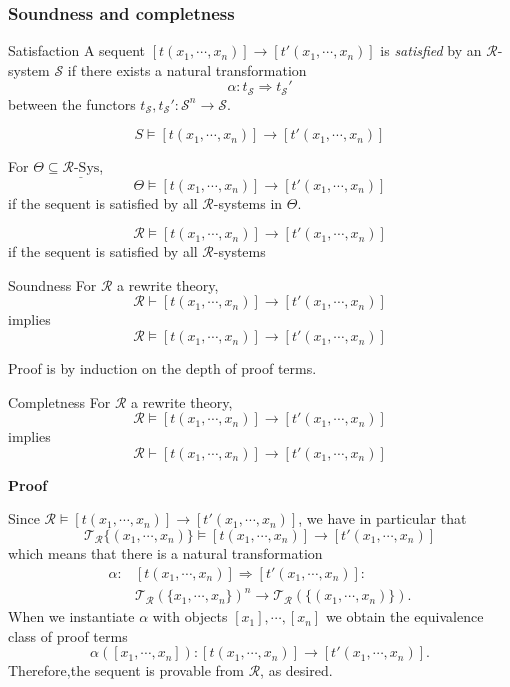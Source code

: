\documentclass{beamer}
\begin{document}
\begin{frame}
    \frametitle{Soundness and completness}
    \scriptsize
    \begin{block}{Satisfaction}
        A sequent $[t(x_1,\cdots,x_n)] \rightarrow [t'(x_1,\cdots,x_n)]$ is \emph{satisfied} by 
        an $\mathcal{R}$-system $\mathcal{S}$ if there exists a natural transformation
        $$ \alpha: t_\mathcal{S} \Rightarrow t_\mathcal{S}'$$ 
        between the functors $t_\mathcal{S},t_\mathcal{S}':\mathcal{S}^n \rightarrow \mathcal{S}.$

        $$ S \models [t(x_1,\cdots,x_n)] \rightarrow [t'(x_1,\cdots,x_n)]$$
    \end{block}
\pause

For $\Theta \subseteq \underline{\mathcal{R}\text{-Sys}}$,
$$ \Theta \models [t(x_1,\cdots,x_n)] \rightarrow [t'(x_1,\cdots,x_n)]$$
if the sequent is satisfied by all $\mathcal{R}$-systems in $\Theta$.

\pause 
$$ \mathcal{R} \models [t(x_1,\cdots,x_n)] \rightarrow [t'(x_1,\cdots,x_n)]$$
if the sequent is satisfied by all $\mathcal{R}$-systems
\end{frame}
\begin{frame}
\begin{block}{Soundness}
    For $\mathcal{R}$ a rewrite theory,
    $$ \mathcal{R} \vdash [t(x_1,\cdots,x_n)] \rightarrow [t'(x_1,\cdots,x_n)]
    $$
    implies
    $$\mathcal{R} \models [t(x_1,\cdots,x_n)] \rightarrow [t'(x_1,\cdots,x_n)]
    $$ 
\end{block}
Proof is by induction on the depth of proof terms.
\end{frame}
\begin{frame}
    \scriptsize
    \begin{block}{Completness}
        For $\mathcal{R}$ a rewrite theory,
        $$ \mathcal{R} \models [t(x_1,\cdots,x_n)] \rightarrow [t'(x_1,\cdots,x_n)]
        $$
        implies
        $$\mathcal{R} \vdash [t(x_1,\cdots,x_n)] \rightarrow [t'(x_1,\cdots,x_n)]
        $$ 

        \pause
        \bigskip
        \textbf{Proof}

        Since $\mathcal{R} \models [t(x_1,\cdots,x_n)] \rightarrow [t'(x_1,\cdots,x_n)]$, we have in particular that 
        $$ \mathcal{T_R}\{(x_1,\cdots,x_n)\} \models [t(x_1,\cdots,x_n)] \rightarrow [t'(x_1,\cdots,x_n)]$$
        which means that there is a natural transformation 
        \begin{align*}
         \alpha:& [t(x_1,\cdots,x_n)] \Rightarrow [t'(x_1,\cdots,x_n)] : \\
        &\mathcal{T_R}(\{x_1,\cdots,x_n\})^n \rightarrow \mathcal{T_R}(\{(x_1,\cdots,x_n)\}).
        \end{align*}
        When we instantiate $\alpha$ with objects $[x_1],\cdots,[x_n]$ we obtain the equivalence class  
        of proof terms 
        $$\alpha([x_1,\cdots, x_n]): [t(x_1,\cdots,x_n)] \rightarrow [t'(x_1,\cdots,x_n)].
        $$
        Therefore,the sequent is provable from $\mathcal{R}$, as desired.
    \end{block}
\end{frame}
\end{document}

